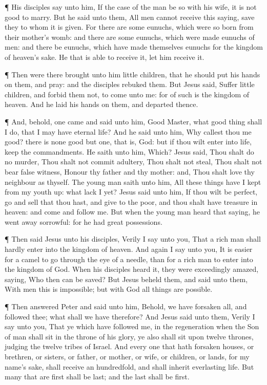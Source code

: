  ¶ His disciples say unto him, If the case of the man be so
with his wife, it is not good to marry.  But he said unto
them, All men cannot receive this saying, save they to whom it is given.
 For there are some eunuchs, which were so born from their
mother's womb: and there are some eunuchs, which were made eunuchs of
men: and there be eunuchs, which have made themselves eunuchs for the
kingdom of heaven's sake. He that is able to receive it, let him receive
it.

 ¶ Then were there brought unto him little children, that
he should put his hands on them, and pray: and the disciples rebuked
them.  But Jesus said, Suffer little children, and forbid
them not, to come unto me: for of such is the kingdom of heaven.
 And he laid his hands on them, and departed thence.

 ¶ And, behold, one came and said unto him, Good Master,
what good thing shall I do, that I may have eternal life? 
And he said unto him, Why callest thou me good? there is none good but
one, that is, God: but if thou wilt enter into life, keep the
commandments.  He saith unto him, Which? Jesus said, Thou
shalt do no murder, Thou shalt not commit adultery, Thou shalt not
steal, Thou shalt not bear false witness,  Honour thy
father and thy mother: and, Thou shalt love thy neighbour as thyself.
 The young man saith unto him, All these things have I kept
from my youth up: what lack I yet?  Jesus said unto him, If
thou wilt be perfect, go and sell that thou hast, and give to the poor,
and thou shalt have treasure in heaven: and come and follow me.
 But when the young man heard that saying, he went away
sorrowful: for he had great possessions.

 ¶ Then said Jesus unto his disciples, Verily I say unto
you, That a rich man shall hardly enter into the kingdom of heaven.
 And again I say unto you, It is easier for a camel to go
through the eye of a needle, than for a rich man to enter into the
kingdom of God.  When his disciples heard it, they were
exceedingly amazed, saying, Who then can be saved?  But
Jesus beheld them, and said unto them, With men this is impossible; but
with God all things are possible.

 ¶ Then answered Peter and said unto him, Behold, we have
forsaken all, and followed thee; what shall we have therefore?
 And Jesus said unto them, Verily I say unto you, That ye
which have followed me, in the regeneration when the Son of man shall
sit in the throne of his glory, ye also shall sit upon twelve thrones,
judging the twelve tribes of Israel.  And every one that
hath forsaken houses, or brethren, or sisters, or father, or mother, or
wife, or children, or lands, for my name's sake, shall receive an
hundredfold, and shall inherit everlasting life.  But many
that are first shall be last; and the last shall be first.

